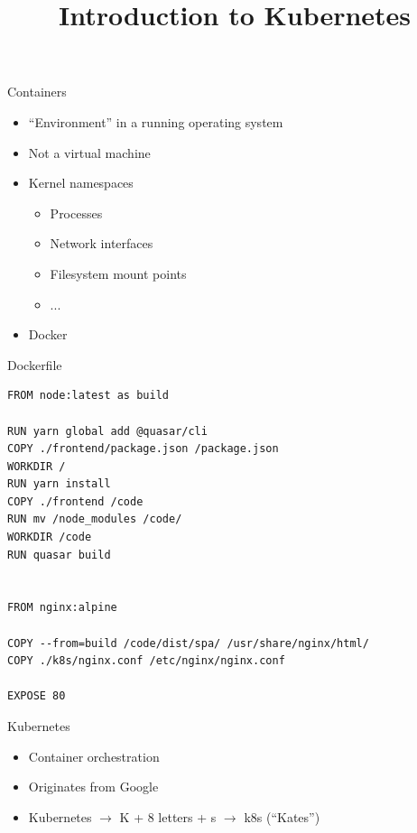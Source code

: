 \documentclass{dcpresentation}
\title{Introduction to Kubernetes}
\author{}
\institute{SciLifeLab Data Centre}
\date{}
\begin{document}
 \begin{frame}
  \maketitle
 \end{frame}

 
 \begin{frame}{Containers}
  \begin{itemize}
   \item ``Environment'' in a running operating system
   \item Not a virtual machine
   \item Kernel namespaces
   \begin{itemize}
    \item Processes
    \item Network interfaces
    \item Filesystem mount points
    \item ...
   \end{itemize}
   \item Docker
  \end{itemize}
 \end{frame}
 
 \begin{frame}[fragile]{Dockerfile}
 \scriptsize
  \begin{verbatim}
FROM node:latest as build

RUN yarn global add @quasar/cli
COPY ./frontend/package.json /package.json
WORKDIR /
RUN yarn install
COPY ./frontend /code
RUN mv /node_modules /code/
WORKDIR /code
RUN quasar build


FROM nginx:alpine

COPY --from=build /code/dist/spa/ /usr/share/nginx/html/
COPY ./k8s/nginx.conf /etc/nginx/nginx.conf

EXPOSE 80
  \end{verbatim}
 \end{frame}


 \begin{frame}{Kubernetes}
  \begin{itemize}
   \item Container orchestration
   \item Originates from Google
   \item Kubernetes $\rightarrow$ K + 8 letters + s $\rightarrow$ k8s (``Kates'')
  \end{itemize}
 \end{frame}
 
\end{document}
